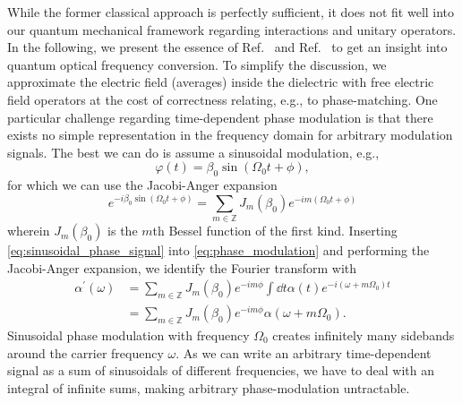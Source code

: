 While the former classical approach is perfectly sufficient, it does not fit well into our quantum mechanical framework regarding interactions and unitary operators.
In the following, we present the essence of Ref.~\cite{QuesadaMejia2015} and Ref.~\cite{Horoshko2018} to get an insight into quantum optical frequency conversion.
To simplify the discussion, we approximate the electric field (averages) inside the dielectric with free electric field operators at the cost of correctness relating, e.g., to phase-matching.
One particular challenge regarding time-dependent phase modulation is that there exists no simple representation in the frequency domain for arbitrary modulation signals. 
The best we can do is assume a sinusoidal modulation, e.g.,
\begin{equation}
	\varphi(t)
	=
	\beta_0
	\sin(\Omega_0t+\phi)
	\label{eq:sinusoidal_phase_signal}
	,
\end{equation}
for which we can use the Jacobi-Anger expansion~\cite[eq.~23]{Horoshko2018}
\begin{equation}
	e^{-i\beta_0\sin(\Omega_0t+\phi)}
	=
	\sum_{m\in\mathbb{Z}}
	J_m(\beta_0)
	e^{-im(\Omega_0t+\phi)}
	\label{eq:jacobi_anger_expansion}
\end{equation}
wherein $J_m(\beta_0)$ is the $m$th Bessel function of the first kind.
Inserting \cref{eq:sinusoidal_phase_signal} into \cref{eq:phase_modulation} and performing the Jacobi-Anger expansion, we identify the Fourier transform with
\begin{equation}
	\begin{split}
		\alpha^\prime(\omega)
		&=
		\sum_{m\in\mathbb{Z}}
		J_m(\beta_0)
		e^{-im\phi}
		\int\dd{t}
		\alpha(t)
		e^{-i(\omega+m\Omega_0)t}
		\\
		&=
		\sum_{m\in\mathbb{Z}}
		J_m(\beta_0)
		e^{-im\phi}
		\alpha(\omega+m\Omega_0)
		.
	\end{split}
	\label{eq:sinusoidal_phase_signal_fourier}
\end{equation}
Sinusoidal phase modulation with frequency $\Omega_0$ creates infinitely many sidebands around the carrier frequency $\omega$.
As we can write an arbitrary time-dependent signal as a sum of sinusoidals of different frequencies, we have to deal with an integral of infinite sums, making arbitrary phase-modulation untractable.

